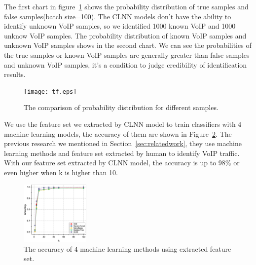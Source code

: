 \documentclass[conference]{IEEEtran}
\begin{document}

The first chart in figure~\ref{fig:tf} shows the probability distribution of true samples and false samples(batch size=100). The CLNN models don't have the ability to identify unknown VoIP samples, so we identified 1000 known VoIP and 1000 unknow VoIP samples. The probability distribution of known VoIP samples and unknown VoIP samples shows in the second chart. We can see the probabilities of the true samples or known VoIP samples are generally greater than false samples and unknown VoIP samples, it's a condition to judge credibility of identification results. 
\begin{figure}[htp]
\begin{center}
\texttt{[image: tf.eps]}
\caption{The comparison of probability distribution for different samples.}\label{fig:tf}
\end{center}
\end{figure}

We use the feature set we extracted by CLNN model to train classifiers with 4 machine learning models, the accuracy of them are shown in Figure~\ref{fig:ml}. The previous research we mentioned in Section~\ref{sec:relatedwork}, they use machine learning methods and feature set extracted by human to identify VoIP traffic. With our feature set extracted by CLNN model, the accuracy is up to 98\% or even higher when k is higher than 10. 
\begin{figure}
  \centering
  \includegraphics[width=0.3\textwidth]{ml.eps}
  \caption{The accuracy of 4 machine learning methods using extracted feature set.}
  \label{fig:ml}
\end{figure}
\end{document}
